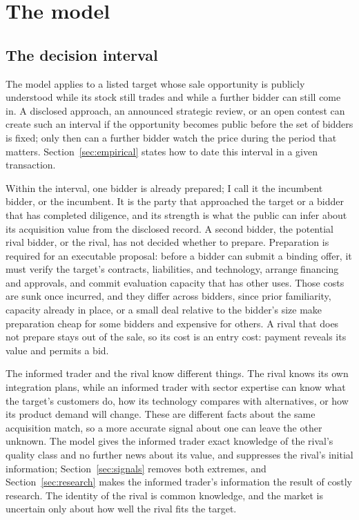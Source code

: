 \section{The model}\label{sec:model}

\subsection{The decision interval}\label{sec:interval}

The model applies to a listed target whose sale opportunity is publicly understood while its stock still
trades and while a further bidder can still come in. A disclosed approach, an announced strategic review, or
an open contest can create such an interval if the opportunity becomes public before the set of bidders is fixed;
only then can a further bidder watch the price during the period that matters.
Section~\ref{sec:empirical} states how to date this interval in a given transaction.

Within the interval, one bidder is already prepared; I call it the incumbent bidder, or the incumbent. It is the
party that approached the target or a bidder that has completed diligence, and its strength is what the public
can infer about its acquisition value from the disclosed record. A second bidder, the potential rival bidder, or
the rival, has not decided whether to prepare. Preparation is required for an executable proposal: before a
bidder can submit a binding offer, it must verify the target's
contracts, liabilities, and technology, arrange financing and approvals, and commit evaluation capacity that
has other uses. Those costs are sunk once incurred, and they differ across bidders, since prior familiarity,
capacity already in place, or a small deal relative to the bidder's size make preparation cheap for some bidders and expensive for others. A rival that does not prepare stays out of the sale, so its cost is an
entry cost: payment reveals its value and permits a bid.

The informed trader and the rival know different things. The rival knows its own integration plans, while an
informed trader with sector expertise can know what the target's customers do, how its technology compares with alternatives, or how its
product demand will change. These are different facts about the same acquisition match, so a more accurate
signal about one can leave the other unknown. The model gives the informed trader exact knowledge of the
rival's quality class and no further news about its value, and suppresses the rival's initial information;
Section~\ref{sec:signals} removes both extremes, and Section~\ref{sec:research} makes the informed trader's
information the result of costly research. The identity of the rival is common knowledge, and the market
is uncertain only about how well the rival fits the target.

